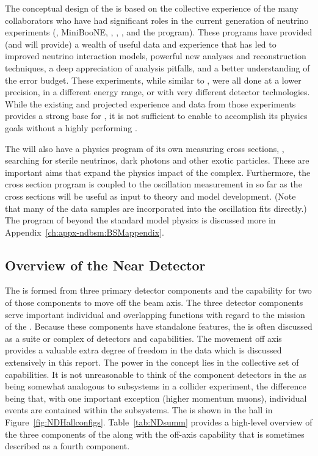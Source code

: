 The conceptual design of the  is based on the collective experience of the many  collaborators who have had significant roles in the current generation of neutrino experiments (, MiniBooNE, , , , and the  program).  These programs have provided (and will provide) a wealth of useful data and experience that has led to improved neutrino interaction models, powerful new analyses and reconstruction techniques, a deep appreciation of analysis pitfalls, and a better understanding of the error budget. 
These experiments, while similar to , were all %
done at a lower precision, in a different energy range, or with very different detector technologies. While the existing and projected experience and data from those experiments provides a strong base for , it is not sufficient to enable  to accomplish its physics goals without a highly performing .  

The   will also have a physics program of its own measuring cross sections, , searching for sterile neutrinos, dark photons and other exotic particles. These are important aims that expand the physics impact of the  complex.  %
Furthermore, the cross section program is coupled to the oscillation measurement in so far as the cross sections will be useful as input to theory and model development.   (Note that many of the  data samples are incorporated into the oscillation fits directly.) The   program of beyond the standard model physics is discussed more in Appendix~\ref{ch:appx-ndbsm:BSMappendix}.


\subsection{Overview of the Near Detector}
\label{sec:appx-nd:BriefOverview}

The   is formed from three primary detector components and the capability for two of those components to move off the beam axis. The three detector components serve important individual and overlapping functions with regard to the mission of the .  Because these components have standalone features, the   is often discussed as a suite or complex of detectors and capabilities.  The movement off axis provides a valuable extra degree of freedom in the data which is discussed extensively in this report.  The power in the   concept lies in the collective set of capabilities.  It is not unreasonable to think of the component detectors in the   as being somewhat analogous to subsystems in a collider experiment, the difference being that, with one important exception (higher momentum muons), individual events are contained within the subsystems.  
The   is shown in the   hall in Figure~\ref{fig:NDHallconfigs}.  Table~\ref{tab:NDsumm} provides a high-level overview of the three components of the   along with the off-axis capability that is sometimes described as a fourth component.  

